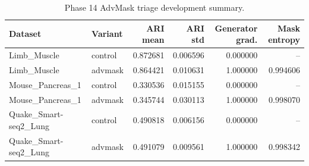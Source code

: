 \begin{table}[ht]
\centering
\caption{Phase 14 AdvMask triage development summary.}
\label{tab:generated-phase14}
\begin{tabular}{llrrrr}
\toprule
Dataset & Variant & ARI mean & ARI std & Generator grad. & Mask entropy \\
\midrule
Limb\_Muscle & control & 0.872681 & 0.006596 & 0.000000 & -- \\
Limb\_Muscle & advmask & 0.864421 & 0.010631 & 1.000000 & 0.994606 \\
Mouse\_Pancreas\_1 & control & 0.330536 & 0.015155 & 0.000000 & -- \\
Mouse\_Pancreas\_1 & advmask & 0.345744 & 0.030113 & 1.000000 & 0.998070 \\
Quake\_Smart-seq2\_Lung & control & 0.490818 & 0.006156 & 0.000000 & -- \\
Quake\_Smart-seq2\_Lung & advmask & 0.491079 & 0.009561 & 1.000000 & 0.998342 \\
\bottomrule
\end{tabular}
\end{table}

